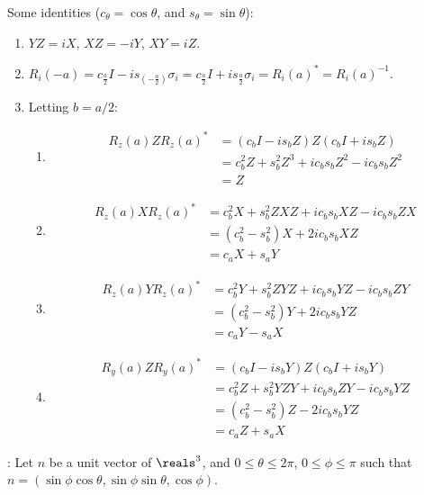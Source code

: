 \begingroup
\newcommand{\roto}[2]{R_{#1} \left( #2 \right)}
\newcommand{\expo}[1]{\exp \left( #1 \right)}
\newcommand{\coso}[1]{\cos \left( #1 \right)}
\newcommand{\sino}[1]{\sin \left( #1 \right)}
%
\par Some identities ($c_\theta = \cos \theta$, and $s_\theta = \sin \theta$):
%
\begin{enumerate}
\item $YZ = iX$, $XZ = -iY$, $XY = iZ$.
%
\item $\roto{i}{-a} = c_{\frac{a}{2}} I - i s_{\left( -\frac{a}{2} \right)} \sigma_i = c_{\frac{a}{2}} I + i s_{\frac{a}{2}} \sigma_i = \roto{i}{a}^* = \roto{i}{a}^{-1}$.
%
\item Letting $b = a/2$:
%
\begin{enumerate}
\item \begin{align*}
\roto{z}{a} Z \roto{z}{a}^* &= \left( c_b I - i s_b Z \right) Z \left( c_b I + i s_b Z \right) \\
&= c_b^2 Z + s_b^2 Z^3 + i c_b s_b Z^2 - i c_b s_b Z^2 \\
&= Z
\end{align*}
%
\item \begin{align*}
\roto{z}{a} X \roto{z}{a}^* &= c_b^2 X + s_b^2 ZXZ + i c_b s_b XZ - i c_b s_b ZX \\
&= \left( c_b^2 - s_b^2 \right) X + 2 i c_b s_b XZ \\
&= c_a X + s_a Y
\end{align*}
%
\item \begin{align*}
\roto{z}{a} Y \roto{z}{a}^* &= c_b^2 Y + s_b^2 ZYZ + i c_b s_b YZ - i c_b s_b ZY \\
&= \left( c_b^2 - s_b^2 \right) Y + 2 i c_b s_b YZ \\
&= c_a Y - s_a X
\end{align*}
%
\item \begin{align*}
\roto{y}{a} Z \roto{y}{a}^* &= \left( c_b I - i s_b Y \right) Z \left( c_b I + i s_b Y \right) \\
&= c_b^2 Z + s_b^2 YZY + i c_b s_b ZY - i c_b s_b YZ \\
&= \left( c_b^2 - s_b^2 \right) Z - 2 i c_b s_b YZ \\
&= c_a Z + s_a X
\end{align*}
\end{enumerate}
\end{enumerate}
%
: Let $n$ be a unit vector of $\reals^3$, and $0 \le \theta \le 2 \pi$, $0 \le \phi \le \pi$ such that $n = \left( \sin \phi \cos \theta, \sin \phi \sin \theta, \cos \phi \right)$.
